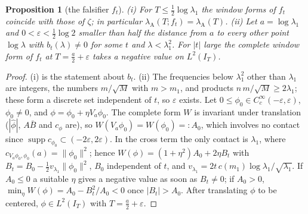 \documentclass[11pt]{amsart}
\newtheorem{proposition}[theorem]{Proposition}
\theoremstyle{definition}
\theoremstyle{remark}
\newcommand{\supp}{\operatorname{supp}}
\newcommand{\IT}{I_T}
\newcommand{\lamA}{\lambda_{\mathrm A}(T)}
\begin{document}
\begin{proposition}[the falsifier $f_t$]\label{prop:ft}
\emph{(i)} For $T\le\frac12\log\lambda_1$ the window forms of $f_t$ coincide with those of $\zeta$; in particular
$\lambda_{\mathrm A}(T;f_t)=\lamA$. \emph{(ii)} Let $a=\log\lambda_1$ and $0<\varepsilon<\frac12\log2$ smaller than
half the distance from $a$ to every other point $\log\lambda$ with $b_t(\lambda)\ne0$ for some $t$ and
$\lambda<\lambda_1^2$. For $|t|$ large the complete window form of $f_t$ at $T=\frac a2+\varepsilon$ takes a negative
value on $L^2(\IT)$.
\end{proposition}
\begin{proof}
(i) is the statement about $b_t$. (ii) The frequencies below $\lambda_1^2$ other than $\lambda_1$ are integers, the
numbers $m/\sqrt M$ with $m>m_1$, and products $n\,m/\sqrt M\ge2\lambda_1$; these form a discrete set independent of
$t$, so $\varepsilon$ exists. Let $0\le\phi_0\in C_c^\infty(-\varepsilon,\varepsilon)$, $\phi_0\ne0$, and
$\phi=\phi_0+\eta V_a\phi_0$. The complete form $W$ is invariant under translation ($|\widehat\phi|$, $A\bar B$ and
$c_\phi$ are), so $W(V_a\phi_0)=W(\phi_0)=:A_0$, which involves no contact since $\supp c_{\phi_0}\subset(-2\varepsilon,2\varepsilon)$.
In the cross term the only contact is $\lambda_1$, where $c_{V_a\phi_0,\phi_0}(a)=\|\phi_0\|^2$; hence
$W(\phi)=(1+\eta^2)A_0+2\eta B_t$ with $B_t=B_0-\frac12 v_{\lambda_1}\|\phi_0\|^2$, $B_0$ independent of $t$, and
$v_{\lambda_1}=2t\,c(m_1)\log\lambda_1/\sqrt{\lambda_1}$. If $A_0\le0$ a suitable $\eta$ gives a negative value as
soon as $B_t\ne0$; if $A_0>0$, $\min_\eta W(\phi)=A_0-B_t^2/A_0<0$ once $|B_t|>A_0$. After translating
$\phi$ to be centered, $\phi\in L^2(\IT)$ with $T=\frac a2+\varepsilon$.
\end{proof}
\end{document}
